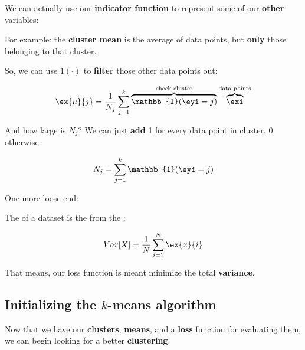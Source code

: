         We can actually use our \textbf{indicator function} to represent some of our \textbf{other} variables:
        
        For example: the \textbf{cluster mean} is the average of data points, but \textbf{only} those belonging to that cluster. 
        
        So, we can use $1(\cdot)$ to \textbf{filter} those other data points out:
        
        \begin{equation}
            \ex{\mu}{j} = \frac{1}{N_j} 
            \sum_{j=1}^k 
                \overbrace{
                    \mathbb{1}(\eyi = j)
                }^{ \text{check cluster} }
                \overbrace{
                    \exi
                }^{ \text{data points} }
        \end{equation}
        
        And how large is $N_j$? We can just \textbf{add} 1 for every data point in cluster, 0 otherwise:
        
        \begin{equation}
            N_j = 
            \sum_{j=1}^k 
                \mathbb{1}(\eyi = j)
        \end{equation}
        
        One more loose end:\\
        
        \begin{definition}
            The  of a dataset is the  from the :
            
            \begin{equation*}
                Var[X] = \frac{1}{N} \sum_{i=1}^{N} \ex{x}{i}
            \end{equation*}
        \end{definition}
        
        That means, our loss function is meant minimize the total \textbf{variance}.
            
    \subsection{Initializing the $k$-means algorithm}
    
        Now that we have our \textbf{clusters}, \textbf{means}, and a \textbf{loss} function for evaluating them, we can begin looking for a better \textbf{clustering}.
        
